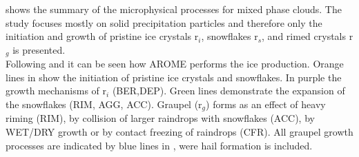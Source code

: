  shows the summary of the microphysical processes for mixed phase clouds. The study focuses mostly on solid precipitation particles and therefore only the initiation and growth of pristine ice crystals r$_i$, snowflakes r$_s$, and rimed crystals r$_g$ is presented. 
\\
Following \cite{pinty_mixed-phased_1998} and  it can be seen how AROME performs the ice production. Orange lines in  show the initiation of pristine ice crystals and snowflakes. In purple the growth mechanisms of r$_i$ (BER,DEP). Green lines demonstrate the expansion of the snowflakes (RIM, AGG, ACC). Graupel (r$_g$) forms as an effect of heavy riming (RIM), by collision of larger raindrops with snowflakes (ACC), by WET/DRY growth or by contact freezing of raindrops (CFR). All graupel growth processes are indicated by blue lines in , were hail formation is included. 


